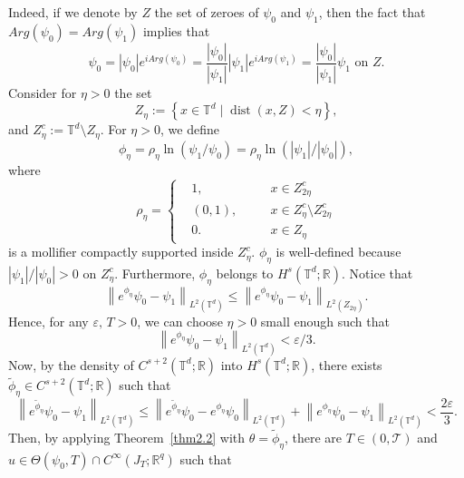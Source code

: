 \documentclass[review]{elsarticle}
\theoremstyle{dotless}
\def\R {\mathbb{R}}
\def \leq{\leqslant}
\numberwithin{equation}{section}
\begin{document}
Indeed, if we denote by $Z$ the set of zeroes of $\psi_0$ and $\psi_1$, then the fact that $Arg(\psi_0)=Arg(\psi_1)$ implies that $$\psi_0=|\psi_0|e^{i Arg(\psi_0)}=\frac{|\psi_0|}{|\psi_1|}|\psi_1|e^{iArg(\psi_1)}=\frac{|\psi_0|}{|\psi_1|}\psi_1 \text{ on } Z.$$
Consider for $\eta>0$ the set
\begin{equation*}
	Z_\eta:=\left\{x \in \mathbb{T}^d \mid \operatorname{dist}(x, Z)<\eta\right\},
\end{equation*}
and $Z_\eta^c:=\mathbb{T}^d\setminus Z_\eta$.   For $\eta>0$, we define
\begin{equation*}
	\phi_\eta=\rho_\eta \ln \left(\psi_1 / \psi_0\right)=\rho_\eta \ln \left(|\psi_1| / |\psi_0|\right),
\end{equation*}
where \begin{equation*}
	\rho_\eta=\left\{\begin{aligned}
		&1,\quad &&x\in Z_{2\eta}^c
		\\&(0,1),\quad && x\in Z_\eta^c\setminus Z_{2\eta}^c
		\\&0.\quad && x\in Z_\eta
	\end{aligned}\right.
\end{equation*}  is a mollifier compactly supported inside $Z_\eta^c$. $\phi_\eta$ is well-defined because $|\psi_1| / |\psi_0|>0$ on $Z_\eta^c$. Furthermore, $\phi_\eta$ belongs to $H^s\left(\mathbb{T}^d;\mathbb{R}\right)$. Notice that
\begin{equation*}
	\left\|e^{ \phi_\eta} \psi_0-\psi_1\right\|_{L^2\left(\mathbb{T}^d\right)}
	\leq\left\|e^{ \phi_\eta} \psi_0-\psi_1\right\|_{L^2\left(Z_{2\eta}\right)}.
\end{equation*}
Hence, for any $\varepsilon,\, T>0$, we can choose $\eta>0$ small enough such that
\begin{equation*}
	\left\|e^{\phi_\eta} \psi_0-\psi_1\right\|_{L^2\left(\mathbb{T}^d\right)}<\varepsilon / 3 .
\end{equation*}
Now, by the density of $C^{s+2}\left(\mathbb{T}^d;\R\right)$ into $H^s\left(\mathbb{T}^d;\R\right)$, there exists $\widetilde{\phi}_\eta \in C^{s+2}\left(\mathbb{T}^d;\R\right)$ such that
\begin{equation*}
	\left\|e^{\widetilde{\phi}_\eta} \psi_0-\psi_1\right\|_{L^2\left(\mathbb{T}^d\right)} \leq\left\|e^{\widetilde{\phi}_\eta} \psi_0-e^{\phi_\eta} \psi_0\right\|_{L^2\left(\mathbb{T}^d\right)}+\left\|e^{\phi_\eta} \psi_0-\psi_1\right\|_{L^2\left(\mathbb{T}^d\right)}<\frac{2 \varepsilon}{3} .
\end{equation*}
Then, by applying Theorem~\ref{thm2.2} with $\theta=\widetilde{\phi}_\eta$, there are $T \in(0, \mathcal{T})$ and $u \in \Theta\left(\psi_0, T\right) \cap C^{\infty}\left(J_T ; \mathbb{R}^q\right)$ such that
\end{document}

